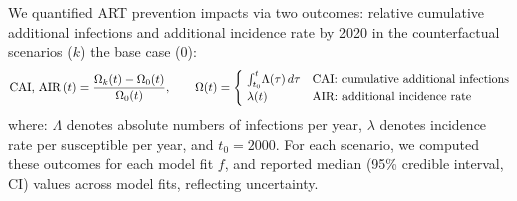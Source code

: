 \par
We quantified ART prevention impacts via two outcomes: relative
cumulative additional infections and additional incidence rate by 2020
in the counterfactual scenarios ($k$) \vs the base case ($0$):
\begin{equation}\label{eq:art.out}
  \textnormal{CAI, AIR}\,(t) = \frac{\Omega_{k}(t) - \Omega_{0}(t)}{\Omega_{0}(t)}
  ,\qquad \Omega(t) =
  \begin{cases}
    ~\int_{t_0}^{t}\!\Lambda(\tau)\,d\tau & \textnormal{CAI: cumulative additional infections} \\
    ~\lambda(t) & \textnormal{AIR: additional incidence rate}
  \end{cases}
\end{equation} where:
$\Lambda$ denotes absolute numbers of infections per year,
$\lambda$ denotes incidence rate per susceptible per year,
and $t_0 = 2000$.
For each scenario, we computed these outcomes for each model fit $f$,
and reported median (95\% credible interval, CI) values across model fits, reflecting uncertainty.
